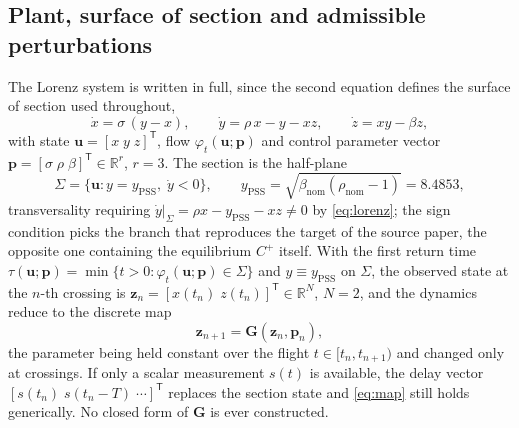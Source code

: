 %

\subsection{Plant, surface of section and admissible perturbations}
\label{subsec:ecr-plant}

The Lorenz system is written in full, since the second equation defines the
surface of section used throughout,
%
\begin{equation}
\dot{x}=\sigma\,(y-x),
\qquad
\dot{y}=\rho\,x-y-xz,
\qquad
\dot{z}=xy-\beta z,
\label{eq:lorenz}
\end{equation}
%
with state $\mathbf{u}=[x\;y\;z]^{\mathsf T}$, flow
$\varphi_t(\mathbf{u};\mathbf{p})$ and control parameter vector
$\mathbf{p}=[\sigma\;\rho\;\beta]^{\mathsf T}\in\mathbb{R}^{r}$, $r=3$. The
section is the half-plane
%
\begin{equation}
\Sigma=\bigl\{\mathbf{u}:y=y_{\mathrm{PSS}},\;\dot y<0\bigr\},
\qquad
y_{\mathrm{PSS}}=\sqrt{\beta_{\mathrm{nom}}(\rho_{\mathrm{nom}}-1)}=8.4853,
\label{eq:section}
\end{equation}
%
transversality requiring $\dot y|_{\Sigma}=\rho x-y_{\mathrm{PSS}}-xz\neq0$ by
\eqref{eq:lorenz}; the sign condition picks the branch that reproduces the
target of the source paper, the opposite one containing the equilibrium
$C^{+}$ itself. With the first return time
$\tau(\mathbf{u};\mathbf{p})=\min\{t>0:\varphi_t(\mathbf{u};\mathbf{p})\in\Sigma\}$
and $y\equiv y_{\mathrm{PSS}}$ on $\Sigma$, the observed state at the $n$-th
crossing is $\mathbf{z}_n=[x(t_n)\;z(t_n)]^{\mathsf T}\in\mathbb{R}^{N}$,
$N=2$, and the dynamics reduce to the discrete map
%
\begin{equation}
\mathbf{z}_{n+1}=\mathbf{G}(\mathbf{z}_n,\mathbf{p}_n),
\label{eq:map}
\end{equation}
%
the parameter being held constant over the flight $t\in[t_n,t_{n+1})$ and
changed only at crossings. If only a scalar measurement $s(t)$ is available, the
delay vector $[s(t_n)\;s(t_n-T)\;\cdots]^{\mathsf T}$ replaces the section state
and \eqref{eq:map} still holds generically. No closed form of $\mathbf{G}$ is
ever constructed.

